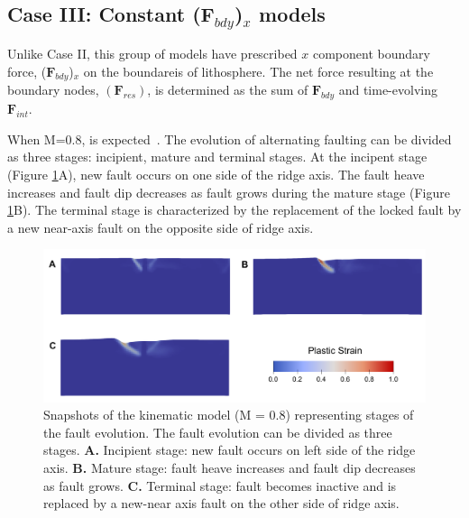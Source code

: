 \documentclass[letterpaper,12pt,notitle]{memphisthesis}                     %
\begin{document}
\subsection{Case III: Constant ($\boldsymbol{F}_{bdy}$)$_x$ models}

Unlike Case II, this group of models have prescribed $x$ component boundary force, ($\boldsymbol{F}_{bdy}$)$_x$ on the boundareis of lithosphere. The net force resulting at the boundary nodes, $(\boldsymbol{F}_{res})$, is determined as the sum of $\boldsymbol{F}_{bdy}$ and time-evolving $\boldsymbol{F}_{int}$.

When M=0.8,  is expected~\citep{Tucholke2008}. The evolution of alternating faulting can be divided as three stages: incipient, mature and terminal stages. At the incipent stage (Figure \ref{fig:faultstage}A), new fault occurs on one side of the ridge axis. The fault heave increases and fault dip decreases as fault grows during the mature stage (Figure \ref{fig:faultstage}B). The terminal stage is characterized by the replacement of the locked fault by a new near-axis fault on the opposite side of ridge axis. 
%
\begin{figure}[!htb]
	\centering
	\includegraphics[width=0.9\linewidth]{./figs/fault_stage.pdf}
	\caption{Snapshots of the kinematic model (M = 0.8) representing stages of the fault evolution. The fault evolution can be divided as three stages. \textbf{A.} Incipient stage: new fault occurs on left side of the ridge axis. \textbf{B.} Mature stage: fault heave increases and fault dip decreases as fault grows. \textbf{C.} Terminal stage: fault becomes inactive and is replaced by a new-near axis fault on the other side of ridge axis.}
	\label{fig:faultstage}
\end{figure}
\end{document}
